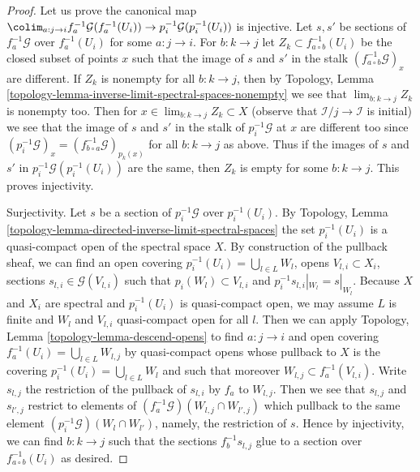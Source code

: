 \begin{proof}
Let us prove the canonical map
$\colim_{a : j \to i} f_a^{-1}\mathcal{G}(f_a^{-1}(U_i)) \to
p_i^{-1}\mathcal{G}(p_i^{-1}(U_i))$ is injective.
Let $s, s'$ be sections of $f_a^{-1}\mathcal{G}$
over $f_a^{-1}(U_i)$ for some $a : j \to i$. For
$b : k \to j$ let $Z_k \subset f_{a \circ b}^{-1}(U_i)$
be the closed subset of points $x$ such that the image of
$s$ and $s'$ in the stalk $(f_{a \circ b}^{-1}\mathcal{G})_x$
are different. If $Z_k$ is nonempty for all $b : k \to j$, then by
Topology, Lemma \ref{topology-lemma-inverse-limit-spectral-spaces-nonempty}
we see that $\lim_{b : k \to j} Z_k$ is nonempty too.
Then for $x \in \lim_{b : k \to j} Z_k \subset X$
(observe that $\mathcal{I}/j \to \mathcal{I}$ is initial)
we see that the image of $s$ and $s'$ in the stalk of
$p_i^{-1}\mathcal{G}$ at $x$ are different too since
$(p_i^{-1}\mathcal{G})_x = (f_{b \circ a}^{-1}\mathcal{G})_{p_k(x)}$
for all $b : k \to j$ as above. Thus if the images of $s$ and $s'$
in $p_i^{-1}\mathcal{G}(p_i^{-1}(U_i))$ are the same, then $Z_k$
is empty for some $b : k \to j$. This proves injectivity.

\medskip\noindent
Surjectivity. Let $s$ be a section of $p_i^{-1}\mathcal{G}$ over
$p_i^{-1}(U_i)$. By
Topology, Lemma \ref{topology-lemma-directed-inverse-limit-spectral-spaces}
the set $p_i^{-1}(U_i)$ is a quasi-compact open of the spectral space $X$.
By construction of the pullback sheaf, we can find an open covering
$p_i^{-1}(U_i) = \bigcup_{l \in L} W_l$,
opens $V_{l, i} \subset X_i$,
sections $s_{l, i} \in \mathcal{G}(V_{l, i})$
such that $p_i(W_l) \subset V_{l, i}$ and $p_i^{-1}s_{l, i}|_{W_l} = s|_{W_l}$.
Because $X$ and $X_i$ are spectral and $p_i^{-1}(U_i)$ is quasi-compact open,
we may assume $L$ is finite and $W_l$ and $V_{l, i}$ quasi-compact open
for all $l$. Then we can apply
Topology, Lemma \ref{topology-lemma-descend-opens}
to find $a : j \to i$ and open covering
$f_a^{-1}(U_i) = \bigcup_{l \in L} W_{l, j}$ by quasi-compact
opens whose pullback to $X$ is the covering
$p_i^{-1}(U_i) = \bigcup_{l \in L} W_l$
and such that moreover $W_{l, j} \subset f_a^{-1}(V_{l, i})$.
Write $s_{l, j}$ the restriction of the pullback of $s_{l, i}$
by $f_a$ to $W_{l, j}$. Then we see that $s_{l, j}$ and $s_{l', j}$
restrict to elements of $(f_a^{-1}\mathcal{G})(W_{l, j} \cap W_{l', j})$
which pullback to the same element $(p_i^{-1}\mathcal{G})(W_l \cap W_{l'})$,
namely, the restriction of $s$. Hence by injectivity, we can find
$b : k \to j$ such that the sections $f_b^{-1}s_{l, j}$
glue to a section over $f_{a \circ b}^{-1}(U_i)$ as desired.
\end{proof}

